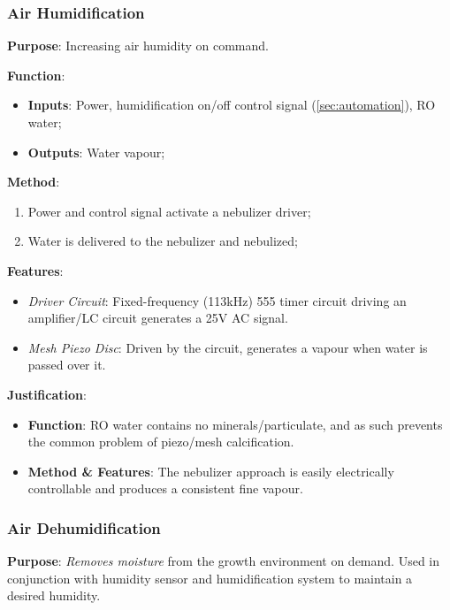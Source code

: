 \documentclass{report}
\begin{document}
\newpage

\subsubsection{Air Humidification}
\label{sec:airhum}

\textbf{Purpose}: Increasing air humidity on command.

\textbf{Function}:
\begin{itemize}
    \item \textbf{Inputs}: Power, humidification on/off control signal (\ref{sec:automation}), RO water;
    \item \textbf{Outputs}: Water vapour;
\end{itemize}

\textbf{Method}:
\begin{enumerate}
    \item Power and control signal activate a nebulizer driver;
    \item Water is delivered to the nebulizer and nebulized;
\end{enumerate}

\textbf{Features}:
\begin{itemize}
    \item \textit{Driver Circuit}: Fixed-frequency (113kHz) 555 timer circuit driving an amplifier/LC circuit generates a 25V AC signal. %
    \item \textit{Mesh Piezo Disc}: Driven by the circuit, generates a vapour when water is passed over it.
\end{itemize}

\textbf{Justification}:
\begin{itemize}
    \item \textbf{Function}: RO water contains no minerals/particulate, and as such prevents the common problem of piezo/mesh calcification.
    \item \textbf{Method \& Features}: The nebulizer approach is easily electrically controllable and produces a consistent fine vapour. 
\end{itemize}

\subsubsection{Air Dehumidification}
\label{sec:dehum}

\textbf{Purpose}: \textit{Removes moisture} from the growth environment on demand. Used in conjunction with humidity sensor and humidification system to maintain a desired humidity.
\end{document}
